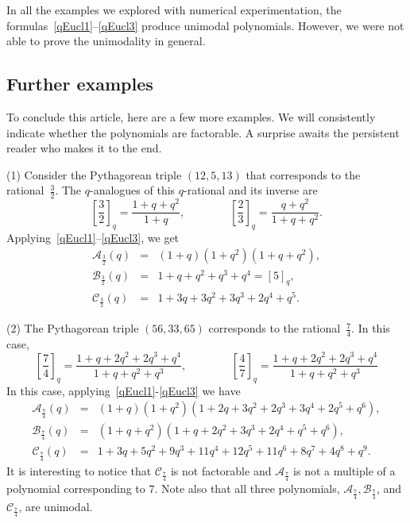 \documentclass{article}[12pt]
\theoremstyle{plain}
\theoremstyle{definition}
\newcommand{\A}{\mathcal{A}}
\newcommand{\B}{\mathcal{B}}
\newcommand{\cC}{\mathcal{C}}
\begin{document}
In all the examples we explored with numerical experimentation,
the formulas~\eqref{qEucl1}--\eqref{qEucl3} produce unimodal polynomials.
However, we were not able to prove the unimodality in general.

\subsection{Further examples}

To conclude this article, here are a few more examples.
We will consistently indicate whether the polynomials are factorable. 
A surprise awaits the persistent reader who makes it to the end.

(1)
Consider the Pythagorean triple $(12,5,13)$ that corresponds to the rational~$\frac{3}{2}$.
The $q$-analogues of this $q$-rational and its inverse are 
$$
\left[\frac{3}{2}\right]_q=\frac{1+q+q^2}{1+q},
\qquad\qquad
\left[\frac{2}{3}\right]_q=\frac{q+q^2}{1+q+q^2}.
$$
Applying~\eqref{qEucl1}--\eqref{qEucl3}, we get
\begin{eqnarray*}
\A_{\frac{3}{2}}(q)&=&
(1+q)(1+q^2)(1+q+q^2),
\\[4pt]
\B_{\frac{3}{2}}(q)&=&
1+q+q^2+q^3+q^4=[5]_q,
\\[4pt]
\cC_{\frac{3}{2}}(q)&=&
1+3q+3q^2+3q^3+2q^4+q^5.
\end{eqnarray*}

(2)
The Pythagorean triple $(56,33,65)$ corresponds to the rational~$\frac{7}{4}$.
In this case,
$$
\left[\frac{7}{4}\right]_q=\frac{1+q+2q^2+2q^3+q^4}{1+q+q^2+q^3},
\qquad\qquad
\left[\frac{4}{7}\right]_q=\frac{1+q+2q^2+2q^3+q^4}{1+q+q^2+q^3}
$$
In this case, applying~\eqref{qEucl1}-\eqref{qEucl3} we have
\begin{eqnarray*}
\A_{\frac{7}{4}}(q)&=&
(1+q)(1+q^2)(1+2q+3q^2+2q^3+3q^4+2q^5+q^6),
\\[4pt]
\B_{\frac{7}{4}}(q)&=&
(1+q+q^2)(1+q+2q^2+3q^3+2q^4+q^5+q^6),
\\[4pt]
\cC_{\frac{7}{4}}(q)&=&
1+3q+5q^2+9q^3+11q^4+12q^5+11q^6+8q^7+4q^8+q^9.
\end{eqnarray*}
It is interesting to notice that $\cC_{\frac{7}{4}}$ 
is not factorable and $\A_{\frac{7}{4}}$ is not a multiple of 
a polynomial corresponding to $7$.
Note also that all three polynomials, $\A_{\frac{7}{4}},\B_{\frac{7}{4}}$, 
and $\cC_{\frac{7}{4}}$, are unimodal.
\end{document}
